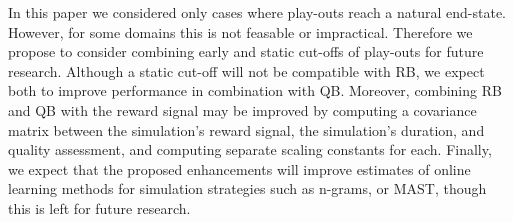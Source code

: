 \documentclass{ecai2014}
\begin{document}
In this paper we considered only cases where play-outs reach a natural end-state. However, for some domains this is not feasable or impractical. Therefore we propose to consider combining early and static cut-offs of play-outs for future research. Although a static cut-off will not be compatible with RB, we expect both to improve performance in combination with QB. Moreover, combining RB and QB with the reward signal may be improved by computing a covariance matrix between the simulation's reward signal, the simulation's duration, and quality assessment, and computing separate scaling constants for each. Finally, we expect that the proposed enhancements will improve estimates of online learning methods for simulation strategies such as n-grams, or MAST, though this is left for future research.



\end{document}
